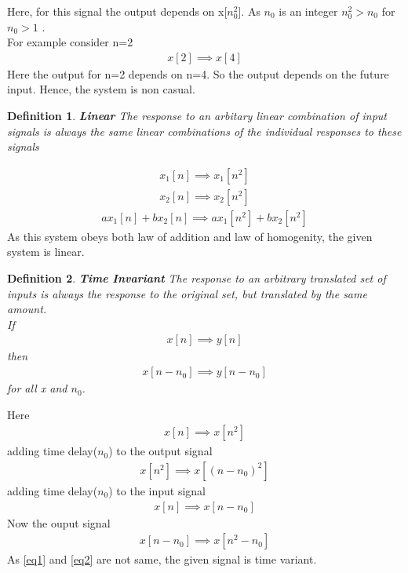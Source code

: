 \documentclass[journal,12pt,twocolumn]{IEEEtran}
\newtheorem{definition}{Definition}[section]
\begin{document}
Here, for this signal the output depends on x[$n_{0}^{2}$]. As $n_{0}$ is an integer $n_{0}^{2}>n_{0}$ for $n_{0}>1$ .\\
For example consider n=2
\begin{align}
    x[2] \implies x[4]
\end{align}
Here the output for n=2 depends on n=4. So the output depends on the future input. Hence, the system is non casual.

\begin{definition}{\textbf{Linear}}
The response to an arbitary linear combination of input signals is always the same linear combinations of the individual responses to these signals 
\end{definition}
\begin{align}
    x_{1}[n] \implies x_{1}[n^{2}]\\
    x_{2}[n] \implies x_{2}[n^{2}]
\end{align}
\begin{align}
    ax_{1}[n]+bx_{2}[n] \implies ax_{1}[n^{2}]+bx_{2}[n^{2}]
\end{align}
As this system obeys both law of addition and law of homogenity, the given system is linear.

\begin{definition}{\textbf{Time Invariant}}
The response to an arbitrary translated set of inputs is always the response to the original set, but translated by the same amount.\\
If 
\begin{align}
    x[n]\implies y[n]
\end{align}
then
\begin{align}
    x[n-n_{0}] \implies y[n-n_{0}]
\end{align} for all x and $n_{0}$.
\end{definition}
Here 
\begin{align}
    x[n]\implies x[n^{2}]
\end{align}
adding time delay($n_{0}$) to the output signal
\begin{align}
\label{eq1}
    x[n^{2}]\implies x[(n-n_{0})^{2}]
\end{align}
adding time delay($n_{0}$) to the input signal 
\begin{align}
    x[n]\implies x[n-n_{0}]
\end{align}
Now the ouput signal 
\begin{align}
\label{eq2}
    x[n-n_{0}]\implies x[n^{2}-n_{0}]
\end{align}
As \ref{eq1} and \ref{eq2} are not same, the given signal is time variant. 
\end{document}
